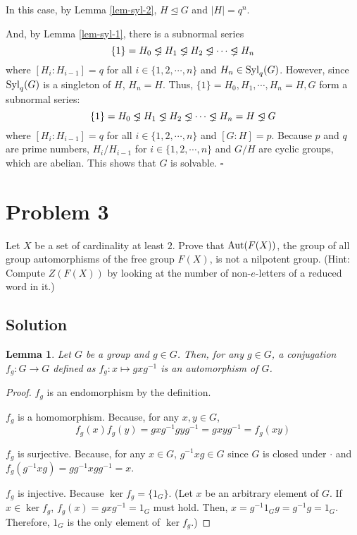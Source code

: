 \documentclass{article}
\newtheorem{lemma}{Lemma}
\newcommand{\qedsq}{\hfill$\square$}
\newcommand{\triangleleftneq}{\mathrel{\ooalign{$\lneq$\cr\raise.22ex\hbox{$\lhd$}\cr}}}
\newcommand{\Aut}{\textnormal{Aut}}
\newcommand{\Syl}{\textnormal{Syl}}
\begin{document}
In this case, by Lemma \ref{lem-syl-2}, \(H \trianglelefteq G\) and \(|H| = q^n\).

And, by Lemma \ref{lem-syl-1}, there is a subnormal series
\[\{1\} = H_0 \triangleleftneq H_1 \triangleleftneq H_2 \triangleleftneq \cdots \triangleleftneq H_n\]
where \([H_{i} : H_{i - 1}] = q\) for all \(i \in \{1, 2, \cdots, n\}\) and \(H_n \in \Syl_q(G)\).
However, since \(\Syl_q(G)\) is a singleton of \(H\), \(H_n = H\).
Thus, \(\{1\} = H_0, H_1, \cdots, H_n = H, G\) form a subnormal series:
\[\{1\} = H_0 \triangleleftneq H_1 \triangleleftneq H_2 \triangleleftneq \cdots \triangleleftneq H_n = H \triangleleftneq G\]
where \([H_{i} : H_{i - 1}] = q\) for all \(i \in \{1, 2, \cdots, n\}\) and \([G : H] = p\).
Because \(p\) and \(q\) are prime numbers, \(H_i / H_{i - 1}\) for \(i \in \{1, 2, \cdots, n\}\) and \(G / H\) are cyclic groups, which are abelian.
This shows that \(G\) is solvable.
\qedsq

\newpage
\section*{Problem 3}
Let \(X\) be a set of cardinality at least \(2\). Prove that \(\Aut(F(X))\), the group of all group automorphisms of the free group \(F(X)\), is not a nilpotent group. (Hint: Compute \(Z(F(X))\) by looking at the number of non-\(e\)-letters of a reduced word in it.)

\subsection*{Solution}

\begin{lemma}\label{lem-conj-aut}
  Let \(G\) be a group and \(g \in G\).
  Then, for any \(g \in G\), a conjugation \(f_g: G \to G\) defined as
  \(f_g: x \mapsto gxg^{-1}\) is an automorphism of \(G\).
\end{lemma}
\begin{proof}
  \(f_g\) is an endomorphism by the definition.

  \(f_g\) is a homomorphism. Because, for any \(x, y \in G\),
  \[f_g(x) f_g(y) = gxg^{-1}gyg^{-1} = gxyg^{-1} = f_g(xy)\]

  \(f_g\) is surjective. Because, for any \(x \in G\), \(g^{-1}xg \in G\) since \(G\) is closed under \(\cdot\) and \(f_g(g^{-1}xg) = gg^{-1}xgg^{-1} = x\).

  \(f_g\) is injective. Because \(\ker f_g = \{1_G\}\).
  (Let \(x\) be an arbitrary element of \(G\).
  If \(x \in \ker f_g\), \(f_g(x) = gxg^{-1} = 1_G\) must hold.
  Then, \(x = g^{-1} 1_G g = g^{-1} g = 1_G\).
  Therefore, \(1_G\) is the only element of \(\ker f_g\).)
\end{proof}
\end{document}

